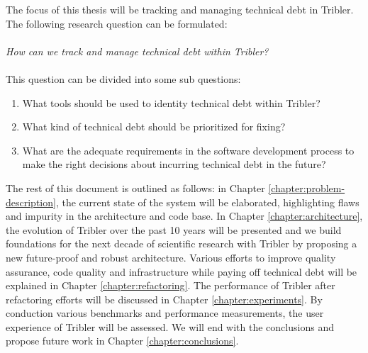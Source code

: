 \newpage

The focus of this thesis will be tracking and managing technical debt in Tribler. The following research question can be formulated:\\\\
\emph{How can we track and manage technical debt within Tribler?}\\\\
This question can be divided into some sub questions:
\begin{enumerate}
	\item What tools should be used to identity technical debt within Tribler?
	\item What kind of technical debt should be prioritized for fixing?
	\item What are the adequate requirements in the software development process to make the right decisions about incurring technical debt in the future?
\end{enumerate}

The rest of this document is outlined as follows: in Chapter \ref{chapter:problem-description}, the current state of the system will be elaborated, highlighting flaws and impurity in the architecture and code base. 
In Chapter \ref{chapter:architecture}, the evolution of Tribler over the past 10 years will be presented and we build foundations for the next decade of scientific research with Tribler by proposing a new future-proof and robust architecture.
Various efforts to improve quality assurance, code quality and infrastructure while paying off technical debt will be explained in Chapter \ref{chapter:refactoring}.
The performance of Tribler after refactoring efforts will be discussed in Chapter \ref{chapter:experiments}.
By conduction various benchmarks and performance measurements, the user experience of Tribler will be assessed.
We will end with the conclusions and propose future work in Chapter \ref{chapter:conclusions}.
